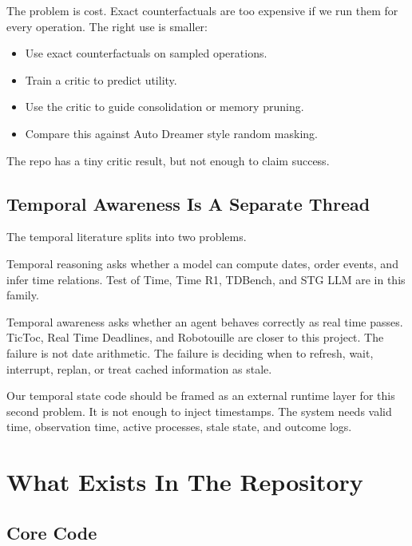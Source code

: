 \documentclass[11pt]{article}
\begin{document}
The problem is cost. Exact counterfactuals are too expensive if we run them for every operation. The right use is smaller:

\begin{itemize}
  \item Use exact counterfactuals on sampled operations.
  \item Train a critic to predict utility.
  \item Use the critic to guide consolidation or memory pruning.
  \item Compare this against Auto Dreamer style random masking.
\end{itemize}

The repo has a tiny critic result, but not enough to claim success.

\subsection{Temporal Awareness Is A Separate Thread}

The temporal literature splits into two problems.

Temporal reasoning asks whether a model can compute dates, order events, and infer time relations. Test of Time, Time R1, TDBench, and STG LLM are in this family.

Temporal awareness asks whether an agent behaves correctly as real time passes. TicToc, Real Time Deadlines, and Robotouille are closer to this project. The failure is not date arithmetic. The failure is deciding when to refresh, wait, interrupt, replan, or treat cached information as stale.

Our temporal state code should be framed as an external runtime layer for this second problem. It is not enough to inject timestamps. The system needs valid time, observation time, active processes, stale state, and outcome logs.

\section{What Exists In The Repository}

\subsection{Core Code}
\end{document}
